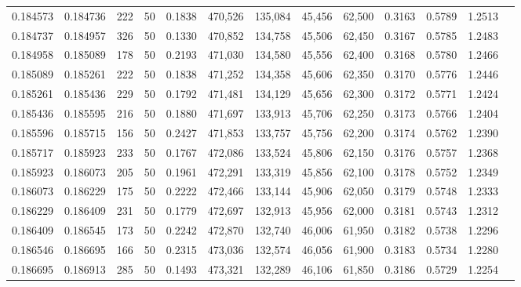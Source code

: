 \begin{tabular}{rrrrrrrrrrrrr}
0.184573 & 0.184736 &   222 &  50 &                                     0.1838 & 470,526 & 135,084 &  45,456 &  62,500 & 0.3163 & 0.5789 & 1.2513 \\
0.184737 & 0.184957 &   326 &  50 &                                     0.1330 & 470,852 & 134,758 &  45,506 &  62,450 & 0.3167 & 0.5785 & 1.2483 \\
0.184958 & 0.185089 &   178 &  50 &                                     0.2193 & 471,030 & 134,580 &  45,556 &  62,400 & 0.3168 & 0.5780 & 1.2466 \\
0.185089 & 0.185261 &   222 &  50 &                                     0.1838 & 471,252 & 134,358 &  45,606 &  62,350 & 0.3170 & 0.5776 & 1.2446 \\
0.185261 & 0.185436 &   229 &  50 &                                     0.1792 & 471,481 & 134,129 &  45,656 &  62,300 & 0.3172 & 0.5771 & 1.2424 \\
0.185436 & 0.185595 &   216 &  50 &                                     0.1880 & 471,697 & 133,913 &  45,706 &  62,250 & 0.3173 & 0.5766 & 1.2404 \\
0.185596 & 0.185715 &   156 &  50 &                                     0.2427 & 471,853 & 133,757 &  45,756 &  62,200 & 0.3174 & 0.5762 & 1.2390 \\
0.185717 & 0.185923 &   233 &  50 &                                     0.1767 & 472,086 & 133,524 &  45,806 &  62,150 & 0.3176 & 0.5757 & 1.2368 \\
0.185923 & 0.186073 &   205 &  50 &                                     0.1961 & 472,291 & 133,319 &  45,856 &  62,100 & 0.3178 & 0.5752 & 1.2349 \\
0.186073 & 0.186229 &   175 &  50 &                                     0.2222 & 472,466 & 133,144 &  45,906 &  62,050 & 0.3179 & 0.5748 & 1.2333 \\
0.186229 & 0.186409 &   231 &  50 &                                     0.1779 & 472,697 & 132,913 &  45,956 &  62,000 & 0.3181 & 0.5743 & 1.2312 \\
0.186409 & 0.186545 &   173 &  50 &                                     0.2242 & 472,870 & 132,740 &  46,006 &  61,950 & 0.3182 & 0.5738 & 1.2296 \\
0.186546 & 0.186695 &   166 &  50 &                                     0.2315 & 473,036 & 132,574 &  46,056 &  61,900 & 0.3183 & 0.5734 & 1.2280 \\
0.186695 & 0.186913 &   285 &  50 &                                     0.1493 & 473,321 & 132,289 &  46,106 &  61,850 & 0.3186 & 0.5729 & 1.2254 \\

\end{tabular}
